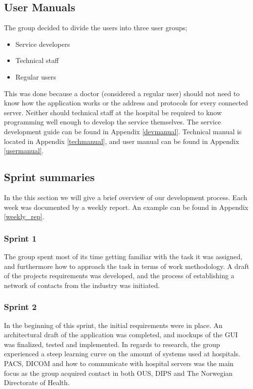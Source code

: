 \subsection{User Manuals}

The group decided to divide the users into three user groups; 
\begin{itemize}
    \item Service developers 
    \item Technical staff
    \item Regular users 
\end{itemize}
This was done because a doctor (considered a regular user) should not need to know how the application works or the address and protocols for every connected server. Neither should technical staff at the hospital be required to know programming well enough to develop the service themselves.
The service development guide can be found in Appendix \ref{devmanual}. Technical manual is located in Appendix \ref{techmanual}, and user manual can be found in Appendix \ref{usermanual}.

\newpage
\subsection{Sprint summaries}
In the this section we will give a brief overview of our development process. Each week was documented by a weekly report. An example can be found in Appendix \ref{weekly_rep}.

\subsubsection{Sprint 1}
The group spent most of its time getting familiar with the task it was assigned, and furthermore how to approach the task in terms of work methodology. A draft of the projects requirements was developed, and the process of establishing a network of contacts from the industry was initiated. 
    
\subsubsection{Sprint 2}
In the beginning of this sprint, the initial requirements were in place. An architectural draft of the application was completed, and mockups of the GUI was finalized, tested and implemented. In regards to research, the group experienced a steep learning curve on the amount of systems used at hospitals. PACS, DICOM and how to communicate with hospital servers was the main focus as the group acquired contact in both OUS, DIPS and The Norwegian Directorate of Health. 



